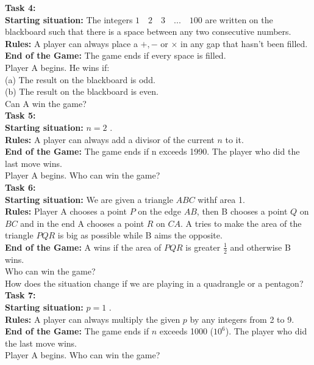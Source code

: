 \documentclass[11pt,a5paper]{article}
\begin{document}
\noindent
\textbf{Task 4:}\\
\noindent
\textbf{Starting situation:} The integers $1 \quad 2 \quad 3 \quad... \quad 100$ are written on the blackboard such that there is a space between any two consecutive numbers.\\
\textbf{Rules:} A player can always place a $+, -$ or $\times$ in any gap that hasn't been filled.\\
\textbf{End of the Game:} The game ends if every space is filled.\\
\noindent
Player A begins. He wins if:\\
(a) The result on the blackboard is odd.\\
(b) The result on the blackboard is even.\\
Can A win the game?\\


\noindent
\textbf{Task 5:}\\
\noindent
\textbf{Starting situation:} $n=2$ .\\
\textbf{Rules:} A player can always add a divisor of the current $n$ to it.\\
\textbf{End of the Game:} The game ends if n exceeds 1990. The player who did the last move wins.\\
\noindent
Player A begins. Who can win the game?\\

\noindent
\textbf{Task 6:}\\
\noindent
\textbf{Starting situation:} We are given a triangle $ABC$ withf area 1. \\
\textbf{Rules:} Player A chooses a point $P$ on the edge $AB$, then B chooses a point $Q$ on $BC$ and in the end A chooses a point $R$ on $CA$. A tries to make the area of the triangle $PQR$ is big as possible while B aims the opposite.\\
\textbf{End of the Game:} A wins if the area of $PQR$ is greater $\frac{1}{2}$ and otherwise B wins.\\
\noindent
 Who can win the game?\\
How does the situation change if we are playing in a quadrangle or a pentagon?\\

\noindent
\textbf{Task 7:}\\
\noindent
\textbf{Starting situation:} $p=1$ .\\
\textbf{Rules:} A player can always multiply the given $p$ by any integers from 2 to 9.\\
\textbf{End of the Game:} The game ends if $n$ exceeds 1000 ($10^6$). The player who did the last move wins.\\
\noindent
Player A begins. Who can win the game?\\
\end{document}
